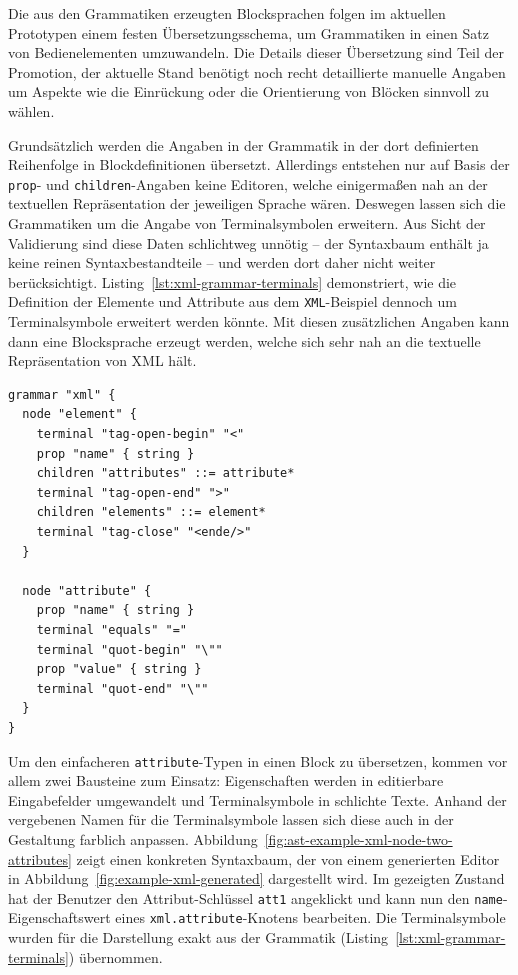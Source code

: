 \documentclass[paper=a4,fontsize=11pt,parskip=half]{scrartcl}
\begin{document}
Die aus den Grammatiken erzeugten Blocksprachen folgen im aktuellen Prototypen einem festen Übersetzungsschema, um Grammatiken in einen Satz von Bedienelementen umzuwandeln. Die Details dieser Übersetzung sind Teil der Promotion, der aktuelle Stand benötigt noch recht detaillierte manuelle Angaben um Aspekte wie die Einrückung oder die Orientierung von Blöcken sinnvoll zu wählen.

Grundsätzlich werden die Angaben in der Grammatik in der dort definierten Reihenfolge in Blockdefinitionen übersetzt. Allerdings entstehen nur auf Basis der \texttt{prop}- und \texttt{children}-Angaben keine Editoren, welche einigermaßen nah an der textuellen Repräsentation der jeweiligen Sprache wären. Deswegen lassen sich die Grammatiken um die Angabe von Terminalsymbolen erweitern. Aus Sicht der Validierung sind diese Daten schlichtweg unnötig -- der Syntaxbaum enthält ja keine reinen Syntaxbestandteile -- und werden dort daher nicht weiter berücksichtigt. Listing~\ref{lst:xml-grammar-terminals} demonstriert, wie die Definition der Elemente und Attribute aus dem \texttt{XML}-Beispiel dennoch um Terminalsymbole erweitert werden könnte. Mit diesen zusätzlichen Angaben kann dann eine Blocksprache erzeugt werden, welche sich sehr nah an die textuelle Repräsentation von XML hält.

\begin{lstlisting}[float=h, label={lst:xml-grammar-terminals},caption={Terminalsymbole für Attribute und Elemente in \texttt{XML} },captionpos=b,language={Grammar}]
grammar "xml" {
  node "element" {
    terminal "tag-open-begin" "<"
    prop "name" { string }
    children "attributes" ::= attribute*
    terminal "tag-open-end" ">"
    children "elements" ::= element*
    terminal "tag-close" "<ende/>"
  }

  node "attribute" {
    prop "name" { string }
    terminal "equals" "="
    terminal "quot-begin" "\""
    prop "value" { string }
    terminal "quot-end" "\""
  }
}
\end{lstlisting}

Um den einfacheren \texttt{attribute}-Typen in einen Block zu übersetzen, kommen vor allem zwei Bausteine zum Einsatz: Eigenschaften werden in editierbare Eingabefelder umgewandelt und Terminalsymbole in schlichte Texte. Anhand der vergebenen Namen für die Terminalsymbole lassen sich diese auch in der Gestaltung farblich anpassen. Abbildung~\ref{fig:ast-example-xml-node-two-attributes} zeigt einen konkreten Syntaxbaum, der von einem generierten Editor in Abbildung~\ref{fig:example-xml-generated} dargestellt wird. Im gezeigten Zustand hat der Benutzer den Attribut-Schlüssel \texttt{att1} angeklickt und kann nun den \texttt{name}-Eigenschaftswert eines \texttt{xml.attribute}-Knotens bearbeiten. Die Terminalsymbole wurden für die Darstellung exakt aus der Grammatik (Listing~\ref{lst:xml-grammar-terminals}) übernommen.
\end{document}
